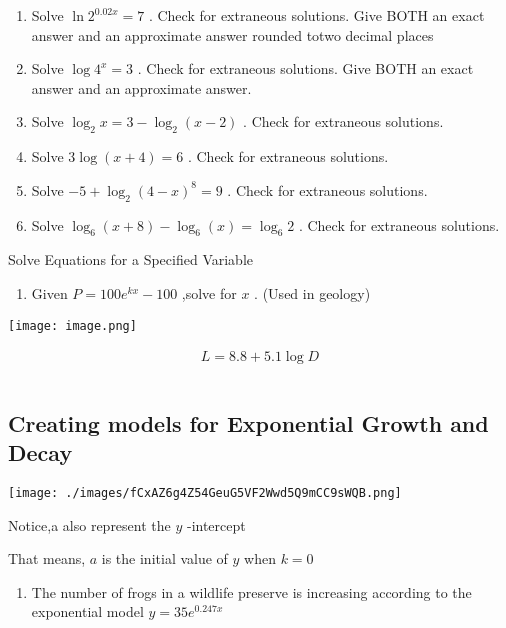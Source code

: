 \documentclass{book}
\begin{document}
\begin{enumerate}
	\def\labelenumi{\arabic{enumi}.}
	\setcounter{enumi}{33}
	\item
	      Solve \(\ln2^{0.02x}=7\) . Check for extraneous solutions. Give BOTH
	      an exact answer and an approximate answer rounded totwo decimal places
	\item
	      Solve \(\log4^{x}=3\) . Check for extraneous solutions. Give BOTH an
	      exact answer and an approximate answer.
	\item
	      Solve \(\log_{2}x=3-\log_{2}(x-2)\) . Check for extraneous solutions.
	\item
	      Solve \(3\log(x+4)=6\) . Check for extraneous solutions.
	\item
	      Solve \(-5+\log_{2}(4-x)^{8}=9\) . Check for extraneous solutions.
	\item
	      Solve \(\log_{6}(x+8)-\log_{6}(x)=\log_{6}2\) . Check for extraneous
	      solutions.
\end{enumerate}

Solve Equations for a Specified Variable

\begin{enumerate}
	\def\labelenumi{\arabic{enumi}.}
	\setcounter{enumi}{39}
	\tightlist
	\item
	      Given \(P=100e^{kx}-100\) ,solve for \(x\) . (Used in geology)
\end{enumerate}

\texttt{[image: image.png]}


	\begin{align}
		L = 8.8+5.1\log D \\  \\
	\end{align}


\subsection{Creating models for Exponential Growth and
	Decay}\label{creating-models-for-exponential-growth-and-decay}

\texttt{[image: ./images/fCxAZ6g4Z54GeuG5VF2Wwd5Q9mCC9sWQB.png]}

Notice,a also represent the \(y\) -intercept

That means, \(a\) is the initial value of \(y\) when \(k=0\)

\begin{enumerate}
	\def\labelenumi{\arabic{enumi}.}
	\setcounter{enumi}{41}
	\tightlist
	\item
	      The number of frogs in a wildlife preserve is increasing according to
	      the exponential model \(y=35e^{0.247x}\)
\end{enumerate}
\end{document}
